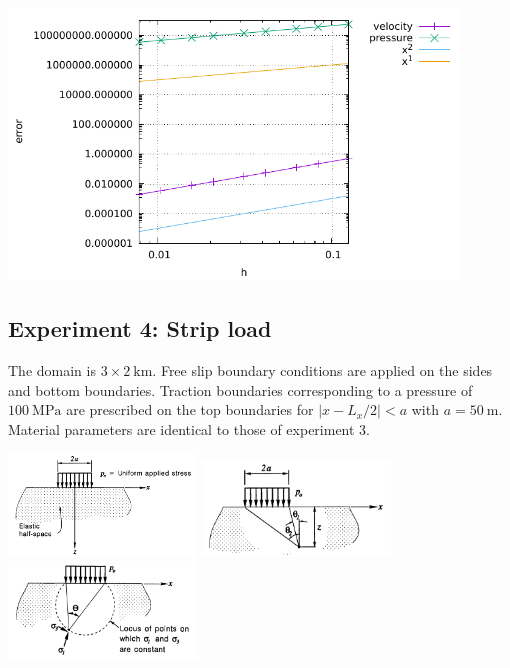 \begin{center}
\includegraphics[width=12cm]{python_codes/fieldstone_34/results/exp3/errors.pdf}
\end{center}


\subsection*{Experiment 4: Strip load}

The domain is $3 \times 2~\si{\km}$. Free slip boundary conditions are 
applied on the sides and bottom boundaries. 
Traction boundaries corresponding to a pressure of $\SI{100}{\mega\pascal}$
are prescribed on the top boundaries for $|x-L_x/2|<a$ with $a=\SI{50}{\meter}$.
Material parameters are identical to those of experiment 3.

\begin{center}
\includegraphics[width=5cm]{python_codes/fieldstone_34/images/dase96a}
\includegraphics[width=5cm]{python_codes/fieldstone_34/images/dase96b}
\includegraphics[width=5cm]{python_codes/fieldstone_34/images/dase96c}
\end{center}


